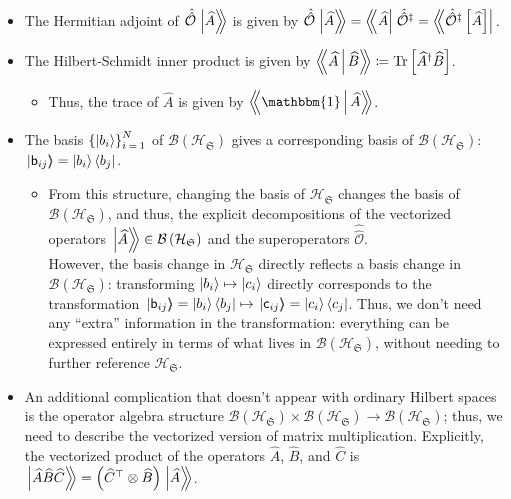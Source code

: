 \documentclass[preprints,article,accept,moreauthors,pdftex]{Definitions/mdpi}
\begin{document}
\begin{paracol}{2}
\begin{itemize}[labelindent=0mm,labelsep=1.25mm,leftmargin=*]
    \item The Hermitian adjoint of $\hat{\hat{\mathcal{O}}}\left.\ket{\widehat{A}}\!\!\right\rangle$ is given by $\hat{\hat{\mathcal{O}}}\left.\ket{\widehat{A}}\!\!\right\rangle = \left\langle\!\!\bra{\widehat{A}}\right.\hat{\hat{\mathcal{O}}}^{\ddagger} = \left\langle\!\!\bra{\hat{\hat{\mathcal{O}}}^{\ddagger}\left[\widehat{A}\right]}\right.$.
    \item The Hilbert-Schmidt inner product is given by $\left\langle\!\!\Braket{\widehat{A}|\widehat{B}}\!\!\right\rangle \coloneqq \mathrm{Tr}\left[\widehat{A}^{\dagger}\widehat{B}\right]$.
    \begin{itemize}[labelindent=0mm,labelsep=1.25mm,leftmargin=*]
        \item Thus, the trace of $\widehat{A}$ is given by $\left\langle\!\!\Braket{\mathbbm{1}|\widehat{A}}\!\!\right\rangle$.
    \end{itemize}
    \item The basis $\left\{\ket{b_{i}}\right\}_{i\:=\:1}^{N}$ of $\mathcal{B}\left(\mathcal{H}_{\mathfrak{S}}\right)$ gives a corresponding basis of $\mathcal{B}\left(\mathcal{H}_{\mathfrak{S}}\right)$: $\left.\ket{\mathsf{b}_{ij}}\!\!\right\rangle = \ket{b_{i}}\bra{b_{j}}$.
        \begin{itemize}[labelindent=0mm,labelsep=1.25mm,leftmargin=*]
        \item From this structure, changing the basis of $\mathcal{H}_{\mathfrak{S}}$ changes the basis of $\mathcal{B}\left(\mathcal{H}_{\mathfrak{S}}\right)$, and thus, the explicit decompositions of the vectorized operators $\left.\ket{\widehat{A}}\!\!\right\rangle \in \mathcal{B}\left(\mathcal{H}_{\mathfrak{S}}\right)$ and the superoperators $\hat{\hat{\mathcal{O}}}$.
        \\[8pt]
        However, the basis change in $\mathcal{H}_{\mathfrak{S}}$ directly reflects a basis change in $\mathcal{B}\left(\mathcal{H}_{\mathfrak{S}}\right)$: transforming $\ket{b_i} \mapsto \ket{c_i}$ directly corresponds to the transformation $\left.\ket{\mathsf{b}_{ij}}\!\!\right\rangle = \ket{b_{i}}\bra{b_{j}} \mapsto \left.\ket{\mathsf{c}_{ij}}\!\!\right\rangle = \ket{c_{i}}\bra{c_{j}}$. Thus, we don’t need any ``extra'' information in the transformation: everything can be expressed entirely in terms of what lives in $\mathcal{B}\left(\mathcal{H}_{\mathfrak{S}}\right)$, without needing to further reference $\mathcal{H}_{\mathfrak{S}}$.
        \end{itemize}
        \item An additional complication that doesn't appear with ordinary Hilbert spaces is the operator algebra structure $\mathcal{B}\left(\mathcal{H}_{\mathfrak{S}}\right)\times\mathcal{B}\left(\mathcal{H}_{\mathfrak{S}}\right)\rightarrow\mathcal{B}\left(\mathcal{H}_{\mathfrak{S}}\right)$; thus, we need to describe the vectorized version of matrix multiplication. Explicitly, the vectorized product of the operators $\widehat{A}$, $\widehat{B}$, and $\widehat{C}$ is $\left.\ket{\widehat{A}\widehat{B}\widehat{C}}\!\!\right\rangle = \left(\widehat{C}^{\top}\otimes{\widehat{B}}\right)\left.\ket{\widehat{A}}\!\!\right\rangle$.

\end{itemize}
\end{paracol}
\end{document}
